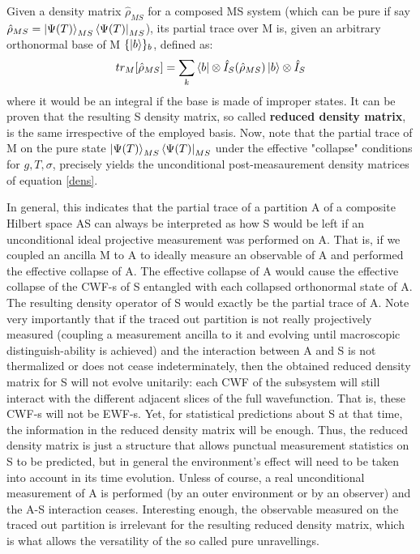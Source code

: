 \documentclass[11pt, a4paper]{article} %
\begin{document}
Given a density matrix $\hat{\rho}_{MS}$ for a composed MS system (which can be pure if say $\hat{\rho}_{MS}=\ket{\Psi(T)}_{MS}\bra{\Psi(T)}_{MS}$), its partial trace over M is, given an arbitrary orthonormal base of M $\{\ket{b}\}_b$, defined as:
\begin{equation}
tr_{M}[\hat{\rho}_{MS}] = \sum_k \bra{b}\otimes \hat{I}_S(\hat{\rho}_{MS})\ket{b}\otimes \hat{I}_S
\end{equation}
where it would be an integral if the base is made of improper states. It can be proven that the resulting S density matrix, so called {\bf reduced density matrix}, is the same irrespective of the employed basis. Now, note that the partial trace of M on the pure state $\ket{\Psi(T)}_{MS}\bra{\Psi(T)}_{MS}$ under the effective "collapse" conditions for $g,T,\sigma$, precisely yields the unconditional post-measaurement density matrices of equation \eqref{dens}. 

In general, this indicates that the partial trace of a partition A of a composite Hilbert space AS can always be interpreted as how S would be left if an unconditional ideal projective measurement was performed on A. That is, if we coupled an ancilla M to A to ideally measure an observable of A and performed the effective collapse of A. The effective collapse of A would cause the effective collapse of the CWF-s of S entangled with each collapsed orthonormal state of A. The resulting density operator of S would exactly be the partial trace of A. Note very importantly that if the traced out partition is not really projectively measured (coupling a measurement ancilla to it and evolving until macroscopic distinguish-ability is achieved) and the interaction between A and S is not thermalized or does not cease indeterminately, then the obtained reduced density matrix for S will not evolve unitarily: each CWF of the subsystem will still interact with the different adjacent slices of the full wavefunction. That is, these CWF-s will not be EWF-s. Yet, for statistical predictions about S at that time, the information in the reduced density matrix will be enough. Thus, the reduced density matrix is just a structure that allows punctual measurement statistics on S to be predicted, but in general the environment's effect will need to be taken into account in its time evolution. Unless of course, a real unconditional measurement of A is performed (by an outer environment or by an observer) and the A-S interaction ceases. Interesting enough, the observable measured on the traced out partition is irrelevant for the resulting reduced density matrix, which is what allows the versatility of the so called pure unravellings.
\end{document}
